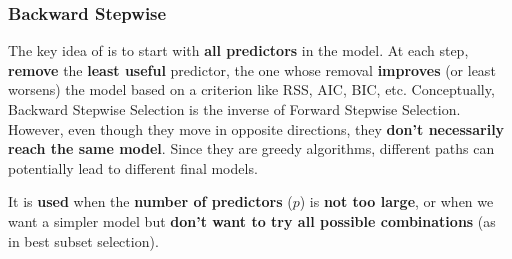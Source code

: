 \subsubsection{Backward Stepwise}\label{subsubsection: Backward Stepwise}

The key idea of  is to start with \textbf{all predictors} in the model. At each step, \textbf{remove} the \textbf{least useful} predictor, the one whose removal \textbf{improves} (or least worsens) the model based on a criterion like RSS, AIC, BIC, etc. Conceptually, Backward Stepwise Selection is the inverse of Forward Stepwise Selection. However, even though they move in opposite directions, they \textbf{don't necessarily reach the same model}. Since they are greedy algorithms, different paths can potentially lead to different final models.

\highspace
It is \textbf{used} when the \textbf{number of predictors} ($p$) is \textbf{not too large}, or when we want a simpler model but \textbf{don't want to try all possible combinations} (as in best subset selection).

